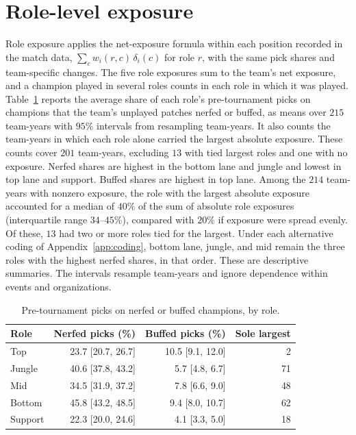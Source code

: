\documentclass[11pt]{article}
\begin{document}
\section{Role-level exposure}
\label{app:roles}
Role exposure applies the net-exposure formula within each position recorded in the match data, $\sum_c w_i(r,c)\,\delta_i(c)$ for role $r$, with the same pick shares and team-specific changes. The five role exposures sum to the team's net exposure, and a champion played in several roles counts in each role in which it was played. Table~\ref{tab:roles} reports the average share of each role's pre-tournament picks on champions that the team's unplayed patches nerfed or buffed, as means over $215$ team-years with $95\%$ intervals from resampling team-years. It also counts the team-years in which each role alone carried the largest absolute exposure. These counts cover $201$ team-years, excluding $13$ with tied largest roles and one with no exposure. Nerfed shares are highest in the bottom lane and jungle and lowest in top lane and support. Buffed shares are highest in top lane. Among the $214$ team-years with nonzero exposure, the role with the largest absolute exposure accounted for a median of $40\%$ of the sum of absolute role exposures (interquartile range $34$--$45\%$), compared with $20\%$ if exposure were spread evenly. Of these, $13$ had two or more roles tied for the largest. Under each alternative coding of Appendix~\ref{app:coding}, bottom lane, jungle, and mid remain the three roles with the highest nerfed shares, in that order. These are descriptive summaries. The intervals resample team-years and ignore dependence within events and organizations.

\begin{table}[h]
\centering
\small
\caption{Pre-tournament picks on nerfed or buffed champions, by role.}
\label{tab:roles}
\begin{tabular}{lrrr}
\toprule
Role & Nerfed picks (\%) & Buffed picks (\%) & Sole largest \\
\midrule
Top & 23.7 [20.7, 26.7] & 10.5 [9.1, 12.0] & 2 \\
Jungle & 40.6 [37.8, 43.2] & 5.7 [4.8, 6.7] & 71 \\
Mid & 34.5 [31.9, 37.2] & 7.8 [6.6, 9.0] & 48 \\
Bottom & 45.8 [43.2, 48.5] & 9.4 [8.0, 10.7] & 62 \\
Support & 22.3 [20.0, 24.6] & 4.1 [3.3, 5.0] & 18 \\
\bottomrule
\end{tabular}
\end{table}
\end{document}
